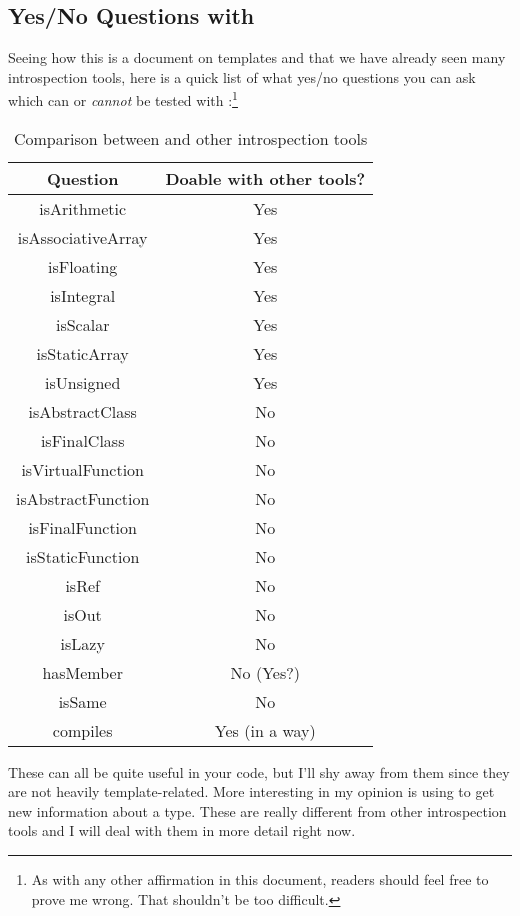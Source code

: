 \subsection{Yes/No Questions with }\label{yesnoquestionsontypes}

Seeing how this is a document on templates and that we have already seen many introspection tools, here is a quick list of what yes/no questions you can ask which can or \emph{cannot} be tested with :\footnote{As with any other affirmation in this document, readers should feel free to prove me wrong. That shouldn't be too difficult.}

\begin{table}[htb]
\centering
\begin{tabular}[c]{|c|c|}
\hline
Question & Doable with other tools? \\
\hline
\hline
isArithmetic & Yes \\
isAssociativeArray & Yes \\
isFloating & Yes \\
isIntegral & Yes \\
isScalar & Yes \\
isStaticArray & Yes \\
isUnsigned & Yes \\
\hline
\hline
isAbstractClass & No \\
isFinalClass & No \\
isVirtualFunction & No \\
isAbstractFunction & No \\
isFinalFunction & No \\
isStaticFunction & No \\
\hline
\hline
isRef & No \\
isOut & No \\
isLazy & No \\
\hline
\hline
hasMember & No (Yes?) \\
isSame & No \\
compiles & Yes (in a way) \\
\hline
\end{tabular}
\caption{Comparison between  and other introspection tools}
\label{table:traits}
\end{table}

These can all be quite useful in your code, but I'll shy away from them since they are not heavily template-related. More interesting in my opinion is using  to get new information about a type. These are really different from other introspection tools and I will deal with them in more detail right now.

